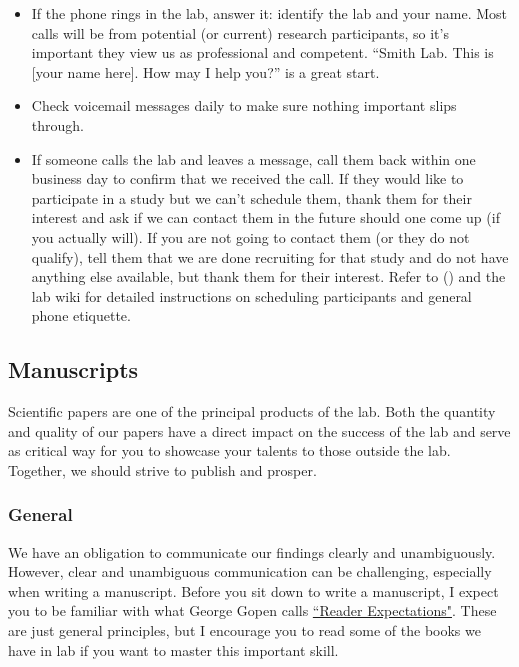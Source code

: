 \documentclass[letterpaper,11pt,oneside]{memoir}
\begin{document}
\begin{itemize}
\item If the phone rings in the lab, answer it: identify the lab and your name. Most calls will be from potential (or current) research participants, so it's important they view us as professional and competent. ``Smith Lab. This is [your name here]. How may I help you?'' is a great start. 
\item Check voicemail messages daily to make sure nothing important slips through.
\item If someone calls the lab and leaves a message, call them back within one business day to confirm that we received the call. If they would like to participate in a study but we can't schedule them, thank them for their interest and ask if we can contact them in the future should one come up (if you actually will). If you are not going to contact them (or they do not qualify), tell them that we are done recruiting for that study and do not have anything else available, but thank them for their interest. Refer to  () and the lab wiki for detailed instructions on scheduling participants and general phone etiquette.

\end{itemize}


\subsection{Manuscripts}
Scientific papers are one of the principal products of the lab. Both the quantity and quality of our papers have a direct impact on the success of the lab and serve as critical way for you to showcase your talents to those outside the lab. Together, we should strive to publish and prosper. 

\subsubsection{General}
\label{sec:ms_general}

We have an obligation to communicate our findings clearly and unambiguously. However, clear and unambiguous communication can be challenging, especially when writing a manuscript. Before you sit down to write a manuscript, I expect you to be familiar with what George Gopen calls \href{https://cseweb.ucsd.edu/~swanson/papers/science-of-writing.pdf}{``Reader Expectations"}. These are just general principles, but I encourage you to read some of the books we have in lab if you want to master this important skill. 
\end{document}
